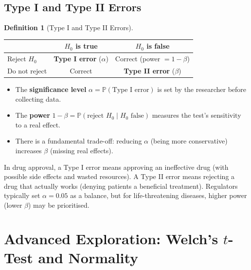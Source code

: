 \documentclass[12pt, a4paper, oneside]{book}
\theoremstyle{definition}
\newtheorem{definition}{Definition}[section]
\theoremstyle{plain}
\theoremstyle{remark}
\newcommand{\Prob}{\mathbb{P}}
\begin{document}
\subsection{Type I and Type II Errors}

\begin{definition}[Type I and Type II Errors]
\begin{center}
\begin{tabular}{lcc}
\toprule
& $H_0$ is true & $H_0$ is false \\
\midrule
Reject $H_0$    & \textbf{Type I error} ($\alpha$) & Correct (power $=1-\beta$) \\
Do not reject   & Correct & \textbf{Type II error} ($\beta$) \\
\bottomrule
\end{tabular}
\end{center}
\end{definition}

\begin{itemize}
  \item The \textbf{significance level} $\alpha = \Prob(\text{Type I error})$ is set
        by the researcher before collecting data.
  \item The \textbf{power} $1-\beta = \Prob(\text{reject }H_0\mid H_0\text{ false})$
        measures the test's sensitivity to a real effect.
  \item There is a fundamental trade-off: reducing $\alpha$ (being more
        conservative) increases $\beta$ (missing real effects).
\end{itemize}

\begin{realworld}
In drug approval, a Type I error means approving an ineffective drug
(with possible side effects and wasted resources).  A Type II error means
rejecting a drug that actually works (denying patients a beneficial treatment).
Regulators typically set $\alpha=0.05$ as a balance, but for life-threatening
diseases, higher power (lower $\beta$) may be prioritised.
\end{realworld}

\section{Advanced Exploration: Welch's $t$-Test and Normality}
\end{document}
